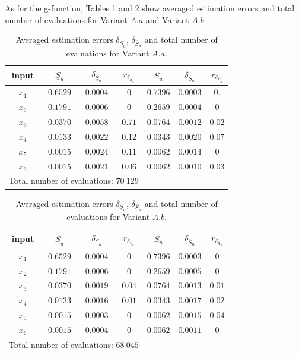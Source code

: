 As for the g-function, Tables \ref{res.bratley.Aa} and \ref{res.bratley.Ab} show averaged estimation errors and total number of evaluations for Variant $A.a$ and Variant $A.b$.
\begin{table}[!ht]
\caption{Averaged estimation errors $\delta_{\underline{S}_u}$, $\delta_{\overline{S}_u}$ and total number of evaluations for Variant $A.a$.}
\centering
\begin{tabular}{ccccccc}
\hline
 input & $\underline{S}_u$ & $\delta_{\underline{S}_u}$ & $r_{\delta_{\underline{S}_u}}$ & $\overline{S}_u$ & $\delta_{\overline{S}_u}$ &$r_{\delta_{\overline{S}_u}}$ \\ \hline
 $x_1$ & $0.6529$ &  $0.0004$ & $0$ & $0.7396$ & $0.0003$ & $0.$ \\ \hline
 $x_2$ & $0.1791$ &  $0.0006$ & $0$ & $0.2659$ & $0.0004$ & $0$ \\ \hline
 $x_3$ & $0.0370$ &  $0.0058$ & $0.71$ & $0.0764$ & $0.0012$ & $0.02$ \\ \hline
 $x_4$ & $0.0133$ &  $0.0022$ & $0.12$ & $0.0343$ & $0.0020$ & $0.07$ \\ \hline
 $x_5$ & $0.0015$ &  $0.0024$ & $0.11$ & $0.0062$ & $0.0014$ & $0$ \\ \hline
 $x_6$ & $0.0015$ & $0.0021$ & $0.06$  & $0.0062$ & $0.0010$ & $0.03$ \\ \hline \hline
\multicolumn{4}{l}{Total number of evaluations: $70 \ 129$} & & &\\ \hline 
\end{tabular}
\label{res.bratley.Aa}
\end{table}
\begin{table}[!ht]
\caption{Averaged estimation errors $\delta_{\underline{S}_u}$, $\delta_{\overline{S}_u}$ and total number of evaluations for Variant $A.b$.}
\centering
\begin{tabular}{ccccccc}
\hline
 input & $\underline{S}_u$ & $\delta_{\underline{S}_u}$ & $r_{\delta_{\underline{S}_u}}$ & $\overline{S}_u$ & $\delta_{\overline{S}_u}$ & $r_{\delta_{\overline{S}_u}}$ \\ \hline
 $x_1$ & $0.6529$ &  $0.0004$ & $0$ & $0.7396$ & $0.0003$ & $0$ \\ \hline
 $x_2$ & $0.1791$ &  $0.0006$ & $0$ & $0.2659$ & $0.0005$ & $0$ \\ \hline
 $x_3$ & $0.0370$ &  $0.0019$ & $0.04$ & $0.0764$ & $0.0013$ & $0.01$ \\ \hline
 $x_4$ & $0.0133$ &  $0.0016$ & $0.01$ & $0.0343$ & $0.0017$ & $0.02$ \\ \hline
 $x_5$ & $0.0015$ &  $0.0003$ & $0$ & $0.0062$ & $0.0015$ & $0.04$ \\ \hline
 $x_6$ & $0.0015$ &  $0.0004$ & $0$  & $0.0062$ & $0.0011$ & $0$ \\ \hline \hline
\multicolumn{4}{l}{Total number of evaluations: $68 \ 045$} & & &\\ \hline 
\end{tabular}
\label{res.bratley.Ab}
\end{table}
